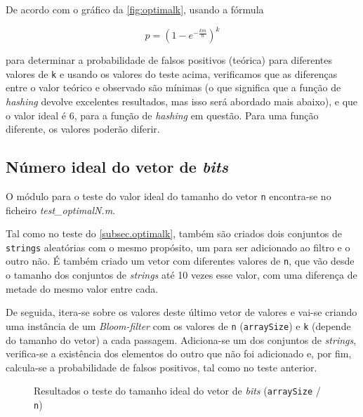 \documentclass[a4paper,11pt,openright,oneside]{report}
\begin{document}
De acordo com o gráfico da \autoref{fig:optimalk}, usando a fórmula 

$$ p =  \left(1 - e^{-\frac{km}{n}}\right)^k $$

para determinar a probabilidade de falsos positivos (teórica) para diferentes valores de \texttt{k} e usando os valores do teste acima, verificamos que as diferenças entre o valor teórico e observado são mínimas (o que significa que a função de \textit{hashing} devolve excelentes resultados, mas isso será abordado mais abaixo), e que o valor ideal é 6, para a função de \textit{hashing} em questão. Para uma função diferente, os valores poderão diferir.

\subsection{Número ideal do vetor de \textit{bits}}
\label{subsec.optimaln}

O módulo para o teste do valor ideal do tamanho do vetor \texttt{n} encontra-se no ficheiro \textit{test\_optimalN.m}.

Tal como no teste do \autoref{subsec.optimalk}, também são criados dois conjuntos de \texttt{strings} aleatórias com o mesmo propósito, um para ser adicionado ao filtro e o outro não. É também criado um vetor com diferentes valores de \texttt{n}, que vão desde o tamanho dos conjuntos de \textit{strings} até 10 vezes esse valor, com uma diferença de metade do mesmo valor entre cada.

De seguida, itera-se sobre os valores deste último vetor de valores e vai-se criando uma instância de um \textit{Bloom-filter} com os valores de \texttt{n} (\texttt{arraySize}) e \texttt{k} (depende do tamanho do vetor) a cada passagem. Adiciona-se um dos conjuntos de \textit{strings}, verifica-se a existência dos elementos do outro que não foi adicionado e, por fim, calcula-se a probabilidade de falsos positivos, tal como no teste anterior.

\begin{figure}[ht]	
\center
{}
\caption{Resultados o teste do tamanho ideal do vetor de \textit{bits} (\texttt{arraySize} / \texttt{n})}
\label{fig:optimalnimg}
\end{figure}
\end{document}
